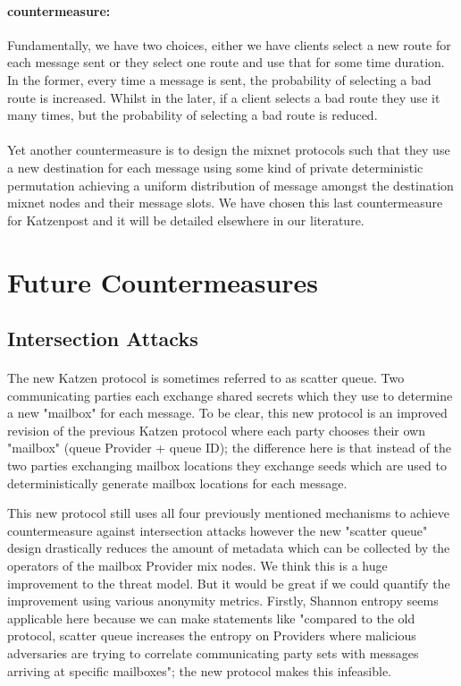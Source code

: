 \documentclass{article}
\begin{document}
\paragraph{countermeasure:} Fundamentally, we have two choices, either we have clients select a new route for each message sent or they select one route and use that for some time duration. In the former, every time a message is sent, the probability of selecting a bad route is increased. Whilst in the later, if a client selects a bad route they use it many times, but the probability of selecting a bad route is reduced.
\paragraph{}Yet another countermeasure is to design the mixnet protocols such that they use a new destination for each message using some kind of private deterministic permutation achieving a uniform distribution of message amongst the destination mixnet nodes and their message slots. We have chosen this last countermeasure  for Katzenpost and it will be detailed elsewhere in our literature.



\section{Future Countermeasures}

\subsection{Intersection Attacks}

\paragraph{}The new Katzen protocol is sometimes referred to as scatter queue.
Two communicating parties each exchange shared secrets which they use to determine
a new "mailbox" for each message. To be clear, this new protocol is an improved revision of the previous Katzen protocol where
each party chooses their own "mailbox" (queue Provider + queue ID); the difference here is
that instead of the two parties exchanging mailbox locations they exchange seeds which are
used to deterministically generate mailbox locations for each message.

This new protocol still uses all four previously mentioned mechanisms to achieve countermeasure against intersection attacks
however the new "scatter queue" design drastically reduces the amount of metadata which can be collected by the operators
of the mailbox Provider mix nodes. We think this is a huge improvement to the threat model. But it would be great if we could
quantify the improvement using various anonymity metrics. Firstly, Shannon entropy seems applicable here because we can make
statements like "compared to the old protocol, scatter queue increases the entropy on Providers where malicious adversaries are
trying to correlate communicating party sets with messages arriving at specific mailboxes"; the new protocol makes this infeasible. 
\end{document}
